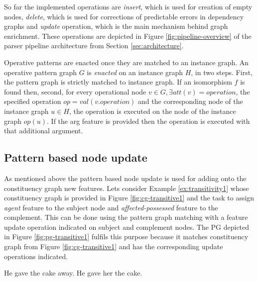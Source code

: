 So far the implemented operations are \textit{insert}, which is used for creation of empty nodes, \textit{delete}, which is used for corrections of predictable errors in dependency graphs and \textit{update} operation, which is the main mechanism behind graph enrichment. These operations are depicted in Figure \ref{fig:pipeline-overview} of the parser pipeline architecture from Section \ref{sec:architecture}.

Operative patterns are enacted once they are matched to an instance graph. 
An operative pattern graph $G$ is \textit{enacted} on an instance graph $H$, in two steps. First, the pattern graph is strictly matched to instance graph. If an isomorphism $f$ is found then, second, for every operational node $v \in G, \exists att(v)=operation$, the specified operation $op = val(v.operation)$ and the corresponding node of the instance graph $u \in H$, the operation is executed on the node of the instance graph $op(u)$. If the arg feature is provided then the operation is executed with that additional argument. 

\subsection{Pattern based node update} 

As mentioned above the pattern based node update is used for adding onto the constituency graph new features. Lets consider Example \ref{ex:transitivity1} whose constituency graph is provided in Figure \ref{fig:cg-transitive1} and the task to assign \textit{agent} feature to the subject node and \textit{affected-possessed} feature to the complement. This can be done using the pattern graph matching with a feature update operation indicated on subject and complement nodes. The PG depicted in Figure \ref{fig:pg-transitive1} fulfils this purpose because it matches constituency graph from Figure \ref{fig:cg-transitive1} and has the corresponding update operations indicated.

\begin{exe}
    \ex\label{ex:transitivity1} He gave the cake away.
    \ex\label{ex:transitivity2} He gave her the cake.
\end{exe}



